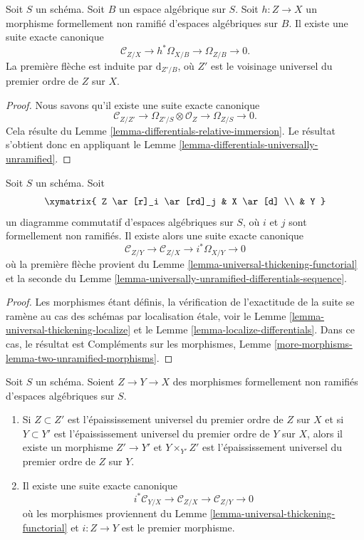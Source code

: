 \begin{lemma}
\label{lemma-universally-unramified-differentials-sequence}
Soit $S$ un schéma. Soit $B$ un espace algébrique sur $S$.
Soit $h : Z \to X$ un morphisme formellement non ramifié d'espaces
algébriques sur $B$.
Il existe une suite exacte canonique
$$
\mathcal{C}_{Z/X} \to h^*\Omega_{X/B} \to \Omega_{Z/B} \to 0.
$$
La première flèche est induite par $\text{d}_{Z'/B}$, où
$Z'$ est le voisinage universel du premier ordre de $Z$ sur $X$.
\end{lemma}

\begin{proof}
Nous savons qu'il existe une suite exacte canonique
$$
\mathcal{C}_{Z/Z'} \to
\Omega_{Z'/S} \otimes \mathcal{O}_Z \to
\Omega_{Z/S} \to 0.
$$
Cela résulte du
Lemme \ref{lemma-differentials-relative-immersion}.
Le résultat s'obtient donc en appliquant le
Lemme \ref{lemma-differentials-universally-unramified}.
\end{proof}

\begin{lemma}
\label{lemma-two-unramified-morphisms}
Soit $S$ un schéma. Soit
$$
\xymatrix{
Z \ar[r]_i \ar[rd]_j & X \ar[d] \\
& Y
}
$$
un diagramme commutatif d'espaces algébriques sur $S$,
où $i$ et $j$ sont formellement non ramifiés. Il existe alors une
suite exacte canonique
$$
\mathcal{C}_{Z/Y} \to
\mathcal{C}_{Z/X} \to
i^*\Omega_{X/Y} \to 0
$$
où la première flèche provient du
Lemme \ref{lemma-universal-thickening-functorial}
et la seconde du
Lemme \ref{lemma-universally-unramified-differentials-sequence}.
\end{lemma}

\begin{proof}
Les morphismes étant définis, la vérification de l'exactitude de la suite
se ramène au cas des schémas par localisation étale, voir le
Lemme \ref{lemma-universal-thickening-localize}
et le
Lemme \ref{lemma-localize-differentials}.
Dans ce cas, le résultat est
Compléments sur les morphismes,
Lemme \ref{more-morphisms-lemma-two-unramified-morphisms}.
\end{proof}

\begin{lemma}
\label{lemma-transitivity-conormal-unramified}
Soit $S$ un schéma.
Soient $Z \to Y \to X$ des morphismes formellement non ramifiés
d'espaces algébriques sur $S$.
\begin{enumerate}
\item Si $Z \subset Z'$ est l'épaississement universel du premier ordre de $Z$
sur $X$ et si $Y \subset Y'$ est l'épaississement universel du premier ordre de $Y$
sur $X$, alors il existe un morphisme $Z' \to Y'$ et $Y \times_{Y'} Z'$ est
l'épaississement universel du premier ordre de $Z$ sur $Y$.
\item Il existe une suite exacte canonique
$$
i^*\mathcal{C}_{Y/X} \to
\mathcal{C}_{Z/X} \to
\mathcal{C}_{Z/Y} \to 0
$$
où les morphismes proviennent du
Lemme \ref{lemma-universal-thickening-functorial}
et $i : Z \to Y$ est le premier morphisme.
\end{enumerate}
\end{lemma}

